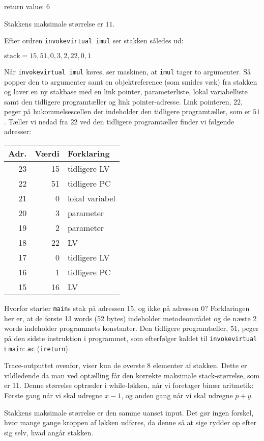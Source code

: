 \documentclass[12pt,a4paper]{article}
\newcommand{\imul}{\texttt{imul}}
\begin{document}
return value: 6

Stakkens maksimale størrelse er $11$.

Efter ordren \texttt{invokevirtual imul} ser stakken således ud:

$\text{stack} = 15, 51, 0, 3, 2, 22, 0, 1$

Når \texttt{invokevirtual imul} køres, ser maskinen, at \imul{} tager to
argumenter. Så popper den to argumenter samt en objektreference (som smides
væk) fra stakken og laver en ny stakbase med en link pointer, parameterliste,
lokal variabelliste samt den tidligere programtæller og link pointer-adresse.
Link pointeren, $22$, peger på hukommelsescellen der indeholder den tidligere
programtæller, som er $51$. Tæller vi nedad fra $22$ ved den tidligere
programtæller finder vi følgende adresser:

\begin{tabular}{|r|r|l|}
	\hline
	Adr. & Værdi & Forklaring \\
	\hline
	23 & 15 & tidligere LV \\
	22 & 51 & tidligere PC \\
	21 & 0 & lokal variabel \\
	20 & 3 & parameter \\
	19 & 2 & parameter \\
	18 & 22 & LV \\
	\hline
	17 & 0 & tidligere LV \\
	16 & 1 & tidligere PC \\
	15 & 16 & LV \\
	\hline
\end{tabular}

Hvorfor starter \texttt{main}s stak på adressen 15, og ikke på adressen 0?
Forklaringen her er, at de første 13 words (52 bytes) indeholder metodeområdet
og de næste 2 words indeholder programmets konstanter. Den tidligere
programtæller, 51, peger på den sidste instruktion i programmet, som
efterfølger kaldet til \texttt{invokevirtual} i \texttt{main}: \texttt{ac}
(\texttt{ireturn}).

Trace-outputtet ovenfor, viser kun de øverste 8 elementer af stakken. Dette er vildledende
da man ved optælling får den korrekte maksimale stack-størrelse, som er 11. Denne
størrelse optræder i while-løkken, når vi foretager binær aritmetik: Første
gang når vi skal udregne $x-1$, og anden gang når vi skal udregne $p+y$.

Stakkens maksimale størrelse er den samme uanset input. Det gør ingen forskel,
hvor mange gange kroppen af løkken udføres, da denne så at sige rydder op efter
sig selv, hvad angår stakken.
\end{document}
